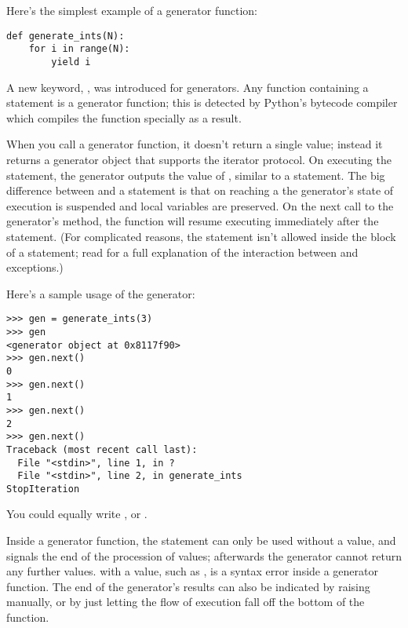 \documentclass{howto}
\begin{document}
Here's the simplest example of a generator function:

\begin{verbatim}
def generate_ints(N):
    for i in range(N):
        yield i
\end{verbatim}

A new keyword, , was introduced for generators.  Any
function containing a  statement is a generator
function; this is detected by Python's bytecode compiler which
compiles the function specially as a result.  

When you call a generator function, it doesn't return a single value;
instead it returns a generator object that supports the iterator
protocol.  On executing the  statement, the generator
outputs the value of , similar to a 
statement.  The big difference between  and a
 statement is that on reaching a  the
generator's state of execution is suspended and local variables are
preserved.  On the next call to the generator's  method,
the function will resume executing immediately after the
 statement.  (For complicated reasons, the
 statement isn't allowed inside the  block
of a  statement; read  for a full
explanation of the interaction between  and
exceptions.)

Here's a sample usage of the  generator:

\begin{verbatim}
>>> gen = generate_ints(3)
>>> gen
<generator object at 0x8117f90>
>>> gen.next()
0
>>> gen.next()
1
>>> gen.next()
2
>>> gen.next()
Traceback (most recent call last):
  File "<stdin>", line 1, in ?
  File "<stdin>", line 2, in generate_ints
StopIteration
\end{verbatim}

You could equally write , or
.

Inside a generator function, the  statement can only
be used without a value, and signals the end of the procession of
values; afterwards the generator cannot return any further values.
 with a value, such as , is a syntax
error inside a generator function.  The end of the generator's results
can also be indicated by raising  manually,
or by just letting the flow of execution fall off the bottom of the
function.
\end{document}
